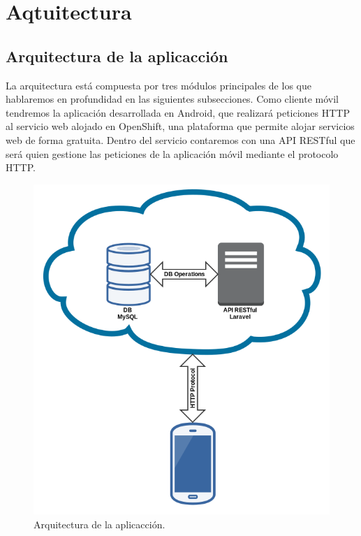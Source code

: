\newpage
\thispagestyle{sectioned}
\chapter{Aqtuitectura}

\section{Arquitectura de la aplicacción}

La arquitectura está compuesta por tres módulos principales de los que hablaremos en profundidad en las siguientes subsecciones. Como cliente móvil tendremos la aplicación desarrollada en Android, que realizará peticiones HTTP al servicio web alojado en OpenShift, una plataforma que permite alojar servicios web de forma gratuita. Dentro del servicio contaremos con una API RESTful que será quien gestione las peticiones de la aplicación móvil mediante el protocolo HTTP.

\begin{figure}[H]
\centering
\includegraphics[keepaspectratio, scale=0.4]{Media/Captures/architecture.png}
\caption{Arquitectura de la aplicacción.}
\label{fig:architecture}
\end{figure}

